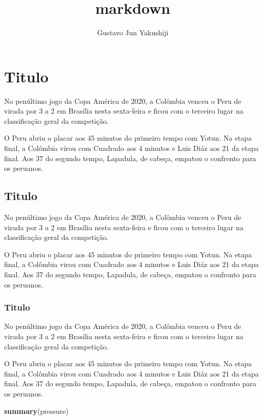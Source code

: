 \documentclass[]{article}
\title{markdown}
\author{Gustavo Jun Yakushiji}
\date{}
\newenvironment{Shaded}{\begin{snugshade}}{\end{snugshade}}
\newcommand{\KeywordTok}[1]{\textcolor[rgb]{0.26,0.66,0.93}{\textbf{#1}}}
\newcommand{\NormalTok}[1]{\textcolor[rgb]{0.74,0.68,0.62}{#1}}
\begin{document}
\maketitle

{
\setcounter{tocdepth}{2}
\tableofcontents
}
\hypertarget{titulo}{%
\section{Titulo}\label{titulo}}

No penúltimo jogo da Copa América de 2020, a Colômbia venceu o Peru de
virada por 3 a 2 em Brasília nesta sexta-feira e ficou com o terceiro
lugar na classificação geral da competição.

O Peru abriu o placar aos 45 minutos do primeiro tempo com Yotun. Na
etapa final, a Colômbia virou com Cuadrado aos 4 minutos e Luis Diáz aos
21 da etapa final. Aos 37 do segundo tempo, Lapadula, de cabeça, empatou
o confronto para os peruanos.

\hypertarget{titulo-1}{%
\subsection{Titulo}\label{titulo-1}}

No penúltimo jogo da Copa América de 2020, a Colômbia venceu o Peru de
virada por 3 a 2 em Brasília nesta sexta-feira e ficou com o terceiro
lugar na classificação geral da competição.

O Peru abriu o placar aos 45 minutos do primeiro tempo com Yotun. Na
etapa final, a Colômbia virou com Cuadrado aos 4 minutos e Luis Diáz aos
21 da etapa final. Aos 37 do segundo tempo, Lapadula, de cabeça, empatou
o confronto para os peruanos.

\hypertarget{titulo-2}{%
\subsubsection{Titulo}\label{titulo-2}}

No penúltimo jogo da Copa América de 2020, a Colômbia venceu o Peru de
virada por 3 a 2 em Brasília nesta sexta-feira e ficou com o terceiro
lugar na classificação geral da competição.

O Peru abriu o placar aos 45 minutos do primeiro tempo com Yotun. Na
etapa final, a Colômbia virou com Cuadrado aos 4 minutos e Luis Diáz aos
21 da etapa final. Aos 37 do segundo tempo, Lapadula, de cabeça, empatou
o confronto para os peruanos.

\begin{Shaded}
\begin{Highlighting}[]
\KeywordTok{summary}\NormalTok{(pressure)}
\end{Highlighting}
\end{Shaded}
\end{document}
